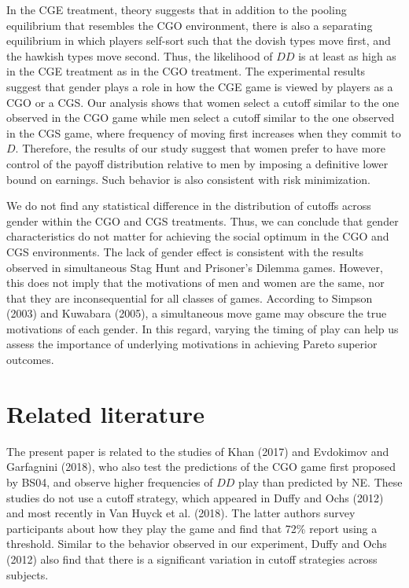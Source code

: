 \documentclass[12pt, letterpaper]{article}
\theoremstyle{plain}
\begin{document}
In the CGE treatment, theory suggests that in addition to the pooling equilibrium that resembles the CGO environment, there is also a separating equilibrium in which players self-sort such that the dovish types move first, and the hawkish types move second. Thus, the likelihood of $DD$ is at least as high as in the CGE treatment as in the CGO treatment. The experimental results suggest that gender plays a role in how the CGE game is viewed by players as a CGO or a CGS. Our analysis shows that women select a cutoff similar to the one observed in the CGO game while men select a cutoff similar to the one observed in the CGS game, where frequency of moving first increases when they commit to $D$. Therefore, the results of our study suggest that women prefer to have more control of the payoff distribution relative to men by imposing a definitive lower bound on earnings. Such behavior is also consistent with risk minimization.

We do not find any statistical difference in the distribution of cutoffs across gender within the CGO and CGS treatments. Thus, we can conclude that gender characteristics do not matter for achieving the social optimum in the CGO and CGS environments. The lack of gender effect is consistent with the results observed in simultaneous Stag Hunt and Prisoner's Dilemma games. However, this does not imply that the motivations of men and women are the same, nor that they are inconsequential for all classes of games. According to Simpson (2003) and Kuwabara (2005), a simultaneous move game may obscure the true motivations of each gender. In this regard, varying the timing of play can help us assess the importance of underlying motivations in achieving Pareto superior outcomes. 
   

\section{Related literature}

The present paper is related to the studies of Khan (2017) and Evdokimov and Garfagnini (2018), who also test the predictions of the CGO game first proposed by BS04, and observe higher frequencies of $DD$ play than predicted by NE. These studies do not use a cutoff strategy, which appeared in Duffy and Ochs (2012) and most recently in Van Huyck et al. (2018). The latter authors survey participants about how they play the game and find that 72\% report using a threshold. Similar to the behavior observed in our experiment, Duffy and Ochs (2012) also find that there is a significant variation in cutoff strategies across subjects. 
\end{document}
